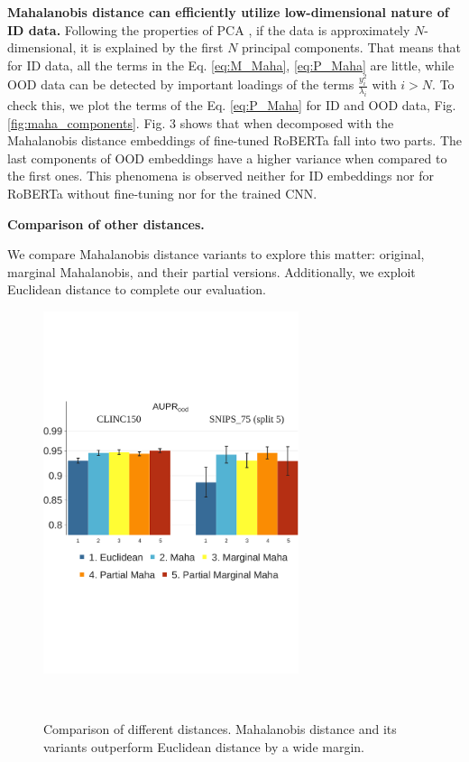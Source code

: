 \documentclass[letterpaper, final]{article} %
\begin{document}
{\bf Mahalanobis distance can efficiently utilize low-dimensional nature of ID data.}
 Following the properties of PCA \cite{murphy2012machine}, if the data is approximately $N$-dimensional, it is explained by the first $N$ principal components. That means that for ID data, all the terms in the Eq. \ref{eq:M_Maha}, \ref{eq:P_Maha} are little, while OOD data can be detected by important loadings of the terms $\frac{y_i^2}{\lambda_i}$ with $i>N$.
 To check this, we plot the terms of the Eq. \ref{eq:P_Maha} for ID and OOD data, Fig. \ref{fig:maha_components}. Fig. 3 shows that when decomposed with the Mahalanobis distance embeddings of fine-tuned RoBERTa fall into two parts. The last components of OOD embeddings have a higher variance when compared to the first ones. This phenomena is observed neither for ID embeddings nor for RoBERTa without fine-tuning nor for the trained CNN.


{\bf Comparison of other distances.}

 We compare Mahalanobis distance variants to explore this matter: original, marginal Mahalanobis, and their partial versions. Additionally, we exploit Euclidean distance to complete our evaluation.


\begin{figure}[ht]
\centering

  \begin{subfloat}
    \centering\includegraphics[width=7.5cm]{images/roberta_aupr_clinc_snips}
    \caption*{}
  \end{subfloat}
  \leavevmode\\[-8ex]

  \caption{Comparison of different distances. Mahalanobis distance and its variants outperform Euclidean distance by a wide margin.}
  \label{fig:maha_var_comp}
\end{figure}
\end{document}
